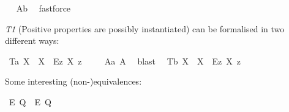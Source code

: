\begin{isabellebody}
\isadelimproof
\ %
\endisadelimproof
%
\isatagproof
{}\isamarkupfalse%
\ A{}b\ \isamarkupfalse%
\ fastforce%
\endisatagproof
{\isafoldproof}%
%
\isadelimproof
%
\endisadelimproof
%
\begin{isamarkuptext}%
\bigbreak%
\end{isamarkuptext}\isamarkuptrue%
%
\begin{isamarkuptext}%
\emph{T1} (Positive properties are possibly instantiated) can be formalised in two different ways:%
\end{isamarkuptext}\isamarkuptrue%
\isamarkupfalse%
\ T{}a{\isacharcolon}\ {\isachardoublequoteopen}{\isasymlfloor}\isactrlbold {\isasymforall}X{\isacharcolon}{\isacharcolon}{\isasymlangle}{\isasymzero}{\isasymrangle}{\isachardot}\ {\isasymP}\ X\ \isactrlbold {\isasymrightarrow}\ \isactrlbold {\isasymdiamond}{\isacharparenleft}\isactrlbold {\isasymexists}\isactrlsup Ez{\isachardot}\ {\isasymlparr}X\ z{\isasymrparr}{\isacharparenright}{\isasymrfloor}{\isachardoublequoteclose}\ \isanewline
%
\isadelimproof
\ \ %
\endisadelimproof
%
\isatagproof
{}\isamarkupfalse%
\ A{}a\ A{}\ \isamarkupfalse%
\ blast\ %
%
\endisatagproof
{\isafoldproof}%
%
\isadelimproof
\isanewline
%
\endisadelimproof
{}\isamarkupfalse%
\ T{}b{\isacharcolon}\ {\isachardoublequoteopen}{\isasymlfloor}\isactrlbold {\isasymforall}X{\isacharcolon}{\isacharcolon}{\isasymup}{\isasymlangle}{\isasymzero}{\isasymrangle}{\isachardot}\ {\isasymP}\ {\isasymdown}X\ \isactrlbold {\isasymrightarrow}\ \isactrlbold {\isasymdiamond}{\isacharparenleft}\isactrlbold {\isasymexists}\isactrlsup Ez{\isachardot}\ X\ z{\isacharparenright}{\isasymrfloor}{\isachardoublequoteclose}\ \isanewline
\ \ \isamarkupfalse%
%
\isadelimproof
\ %
\endisadelimproof
%
\isatagproof
{}\isamarkupfalse%
\ %
%
\endisatagproof
{\isafoldproof}%
%
\isadelimproof
%
\endisadelimproof
%
\begin{isamarkuptext}%
Some interesting (non-)equivalences:%
\end{isamarkuptext}\isamarkuptrue%
\isamarkupfalse%
\ {\isachardoublequoteopen}{\isasymlfloor}\isactrlbold {\isasymbox}\isactrlbold {\isasymexists}\isactrlsup E\ {\isacharparenleft}Q{\isacharcolon}{\isacharcolon}{\isasymup}{\isasymlangle}{\isasymzero}{\isasymrangle}{\isacharparenright}\ \isactrlbold {\isasymleftrightarrow}\ \isactrlbold {\isasymbox}{\isacharparenleft}\isactrlbold {\isasymexists}\isactrlsup E\ \isactrlbold {\isasymdown}Q{\isacharparenright}{\isasymrfloor}{\isachardoublequoteclose}%

\end{isabellebody}
